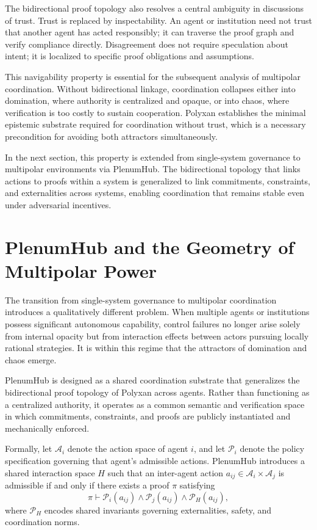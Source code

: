 \documentclass[11pt,oneside]{article}
\begin{document}
The bidirectional proof topology also resolves a central ambiguity in discussions of trust. Trust is replaced by inspectability. An agent or institution need not trust that another agent has acted responsibly; it can traverse the proof graph and verify compliance directly. Disagreement does not require speculation about intent; it is localized to specific proof obligations and assumptions.

This navigability property is essential for the subsequent analysis of multipolar coordination. Without bidirectional linkage, coordination collapses either into domination, where authority is centralized and opaque, or into chaos, where verification is too costly to sustain cooperation. Polyxan establishes the minimal epistemic substrate required for coordination without trust, which is a necessary precondition for avoiding both attractors simultaneously.

In the next section, this property is extended from single-system governance to multipolar environments via PlenumHub. The bidirectional topology that links actions to proofs within a system is generalized to link commitments, constraints, and externalities across systems, enabling coordination that remains stable even under adversarial incentives.

\section{PlenumHub and the Geometry of Multipolar Power}

The transition from single-system governance to multipolar coordination introduces a qualitatively different problem. When multiple agents or institutions possess significant autonomous capability, control failures no longer arise solely from internal opacity but from interaction effects between actors pursuing locally rational strategies. It is within this regime that the attractors of domination and chaos emerge.

PlenumHub is designed as a shared coordination substrate that generalizes the bidirectional proof topology of Polyxan across agents. Rather than functioning as a centralized authority, it operates as a common semantic and verification space in which commitments, constraints, and proofs are publicly instantiated and mechanically enforced.

Formally, let \( \mathcal{A}_i \) denote the action space of agent \( i \), and let \( \mathcal{P}_i \) denote the policy specification governing that agent’s admissible actions. PlenumHub introduces a shared interaction space \( H \) such that an inter-agent action \( a_{ij} \in \mathcal{A}_i \times \mathcal{A}_j \) is admissible if and only if there exists a proof \( \pi \) satisfying
\[
\pi \vdash \mathcal{P}_i(a_{ij}) \wedge \mathcal{P}_j(a_{ij}) \wedge \mathcal{P}_H(a_{ij}),
\]
where \( \mathcal{P}_H \) encodes shared invariants governing externalities, safety, and coordination norms.
\end{document}
